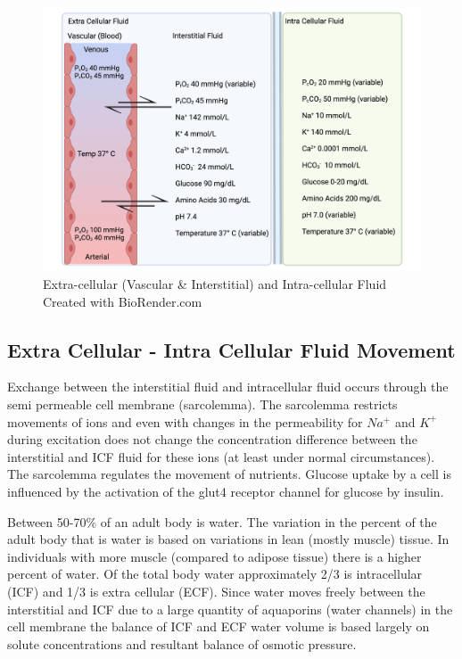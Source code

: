 \begin{figure}[!h]
    \centering
    \includegraphics[width=1.0\linewidth]{./figure/ecf.png}
    \caption{Extra-cellular (Vascular \& Interstitial) and Intra-cellular Fluid \footnotesize{Created with BioRender.com}}
    \label{fig:ecf}
\end{figure}

\subsection{Extra Cellular - Intra Cellular Fluid Movement}

Exchange between the interstitial fluid and intracellular fluid occurs through the semi permeable cell membrane (sarcolemma). The sarcolemma restricts movements of ions and even with changes in the permeability for $Na^+$ and $K^+$ during excitation does not change the concentration difference between the interstitial and ICF fluid for these ions (at least under normal circumstances). The sarcolemma regulates the movement of nutrients.  Glucose uptake by a cell is influenced by the activation of the glut4 receptor channel for glucose by insulin. 

Between 50-70\% of an adult body is water. The variation in the percent of the adult body that is water is based on variations in lean (mostly muscle) tissue. In individuals with more muscle (compared to adipose tissue) there is a higher percent of water. Of the total body water approximately 2/3 is intracellular (ICF) and 1/3 is extra cellular (ECF). Since water moves freely between the interstitial and ICF due to a large quantity of aquaporins (water channels) in the cell membrane the balance of ICF and ECF water volume is based largely on solute concentrations and resultant balance of osmotic pressure.

